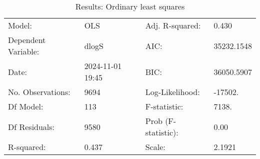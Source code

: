 \begin{table}
\caption{Results: Ordinary least squares}
\label{}
\begin{center}
\begin{tabular}{llll}
\hline
Model:              & OLS              & Adj. R-squared:     & 0.430       \\
Dependent Variable: & dlogS            & AIC:                & 35232.1548  \\
Date:               & 2024-11-01 19:45 & BIC:                & 36050.5907  \\
No. Observations:   & 9694             & Log-Likelihood:     & -17502.     \\
Df Model:           & 113              & F-statistic:        & 7138.       \\
Df Residuals:       & 9580             & Prob (F-statistic): & 0.00        \\
R-squared:          & 0.437            & Scale:              & 2.1921      \\
\hline
\end{tabular}
\end{center}


\end{table}
